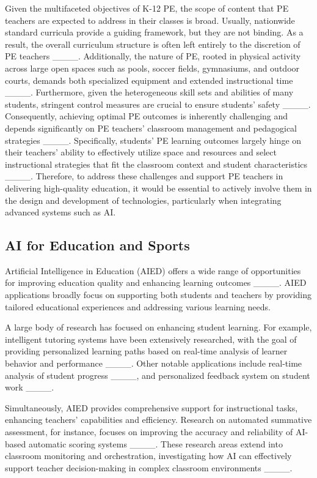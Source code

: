 Given the multifaceted objectives of K-12 PE, the scope of content that PE teachers are expected to address in their classes is broad. Usually, nationwide standard curricula provide a guiding framework, but they are not binding. As a result, the overall curriculum structure is often left entirely to the discretion of PE teachers ____. Additionally, the nature of PE, rooted in physical activity across large open spaces such as pools, soccer fields, gymnasiums, and outdoor courts, demands both specialized equipment and extended instructional time ____. Furthermore, given the heterogeneous skill sets and abilities of many students, stringent control measures are crucial to ensure students' safety ____. Consequently, achieving optimal PE outcomes is inherently challenging and depends significantly on PE teachers' classroom management and pedagogical strategies ____. Specifically, students' PE learning outcomes largely hinge on their teachers' ability to effectively utilize space and resources and select instructional strategies that fit the classroom context and student characteristics ____. Therefore, to address these challenges and support PE teachers in delivering high-quality education, it would be essential to actively involve them in the design and development of technologies, particularly when integrating advanced systems such as AI.



\subsection{AI for Education and Sports} 
Artificial Intelligence in Education (AIED) offers a wide range of opportunities for improving education quality and enhancing learning outcomes ____. AIED applications broadly focus on supporting both students and teachers by providing tailored educational experiences and addressing various learning needs.

A large body of research has focused on enhancing student learning. For example, intelligent tutoring systems have been extensively researched, with the goal of providing personalized learning paths based on real-time analysis of learner behavior and performance ____. Other notable applications include real-time analysis of student progress ____, and personalized feedback system on student work ____.

Simultaneously, AIED provides comprehensive support for instructional tasks, enhancing teachers' capabilities and efficiency. Research on automated summative assessment, for instance, focuses on improving the accuracy and reliability of AI-based automatic scoring systems ____. These research areas extend into classroom monitoring and orchestration, investigating how AI can effectively support teacher decision-making in complex classroom environments ____.


